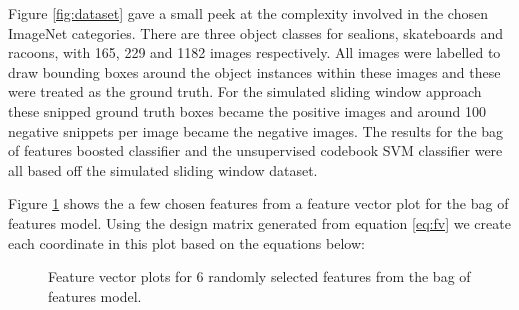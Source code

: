 \documentclass[10pt,twocolumn,letterpaper]{article}
\begin{document}
Figure \ref{fig:dataset} gave a small peek at the complexity involved in the chosen ImageNet
categories. There are three object classes for sealions, skateboards and racoons, with 165, 229 and
1182 images respectively. All images were labelled to draw bounding boxes around the object instances
within these images and these were treated as the ground truth. For the simulated sliding window
approach these snipped ground truth boxes became the positive images and around 100 negative snippets
per image became the negative images. The results for the bag of features boosted classifier and
the unsupervised codebook SVM classifier were all based off the simulated sliding window dataset.

Figure \ref{fig:fv_bw} shows the a few chosen features from a feature vector plot for the bag of features model. 
Using the design matrix generated from equation \ref{eq:fv} we create each coordinate in this plot based on
the equations below:

\begin{figure}[t]
\begin{center}
\end{center}
   \caption{Feature vector plots for 6 randomly selected features from the bag of features model.}
\label{fig:fv_bw}
\end{figure}
\end{document}
